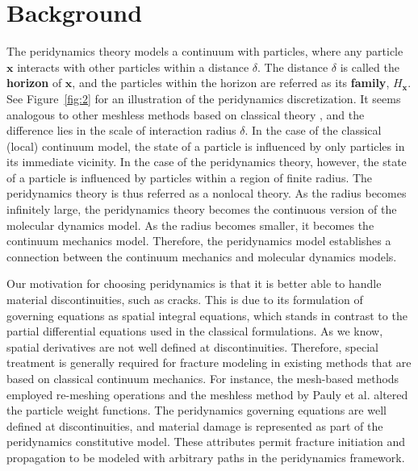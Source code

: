 \section{Background}\label{section:3}

The peridynamics theory models a continuum with particles, where any particle $\mathbf{x}$ interacts with other particles within a distance $\delta$. The distance $\delta$ is called the \textbf{horizon} of $\mathbf{x}$, and the particles within the horizon are referred as its \textbf{family}, $H_\mathbf{x}$. See Figure~\ref{fig:2} for an illustration of the peridynamics discretization. It seems analogous to other meshless methods based on classical theory \cite{Muller:2003:PFS:846276.846298,Muller:2004:PBA:1028523.1028542}, and the difference lies in the scale of interaction radius $\delta$. In the case of the classical (local) continuum model, the state of a particle is influenced by only particles in its immediate vicinity. In the case of the peridynamics theory, however, the state of a particle is influenced by particles within a region of finite radius. The peridynamics theory is thus referred as a nonlocal theory. As the radius becomes infinitely large, the peridynamics theory becomes the continuous version of the molecular dynamics model. As the radius becomes smaller, it becomes the continuum mechanics model. Therefore, the peridynamics model establishes a connection between the continuum mechanics and molecular dynamics models.

Our motivation for choosing peridynamics is that it is better able to handle material discontinuities, such as cracks. This is due to its formulation of governing equations as spatial integral equations, which stands in contrast to the partial differential equations used in the classical formulations. As we know, spatial derivatives are not well defined at discontinuities. Therefore, special treatment is generally required for fracture modeling in existing methods that are based on classical continuum mechanics. For instance, the mesh-based methods \cite{O'Brien:1999:GMA:311535.311550,O'Brien:2002:GMA:566654.566579} employed re-meshing operations and the meshless method by Pauly et al. \cite{Pauly:2005:MAF:1073204.1073296} altered the particle weight functions. The peridynamics governing equations are well defined at discontinuities, and material damage is represented as part of the peridynamics constitutive model. These attributes permit fracture initiation and propagation to be modeled with arbitrary paths in the peridynamics framework.


